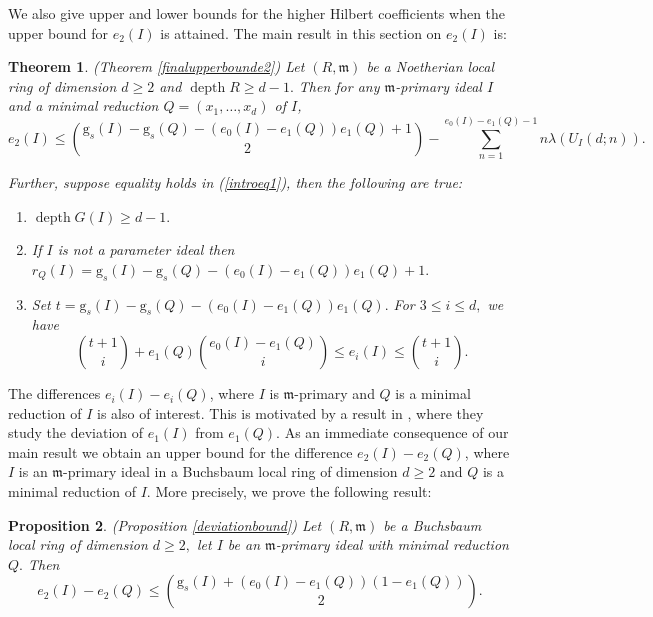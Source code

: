 \documentclass[reqno,a4paper,dvipsnames]{amsart}
\newcommand{\m}{\mathfrak{m} }
\newcommand{\depth}{\operatorname{depth}}
\newtheorem{theorem}{Theorem}[section]
\newtheorem{proposition}[theorem]{Proposition}
\theoremstyle{definition}
\begin{document}
We also give upper and lower bounds for 
the higher Hilbert coefficients  when the upper bound for $e_2(I)$ is attained.
The main result in this section on $e_2(I)$ is:
\begin{theorem} \label{theoremA} (Theorem \ref{finalupperbounde2})
Let $(R,\m)$ be a Noetherian local ring of dimension $d\geq 2$ and  $\depth R \geq d-1.$  Then  for any $\m$-primary ideal  $I$   and a  minimal reduction $Q=(x_1,\ldots,x_{d})$ of $I$, 
\begin{equation} \label{introeq1}
    e_2(I) \leq 
    \binom{\mathrm{g}_s(I) - \mathrm{g}_s(Q) - (e_{0}(I)-e_{1}(Q))e_1(Q) + 1}{2}-\displaystyle \sum_{n=1}^{e_{0}(I)-e_{1}(Q)-1}
           n\lambda(U_{I}(d;n)).
\end{equation}
    
 Further, suppose equality holds in  (\ref{introeq1}), then the following are true: 
 \begin{enumerate}[\normalfont(i)]
     \item    $\depth G(I) \geq d-1.$
     \item    If $I$ is not a parameter ideal  then 
          $r_{Q}(I)=\mathrm{g}_s(I) - \mathrm{g}_s(Q) - (e_{0}(I)-e_{1}(Q))e_1(Q)+1.$
          \item   Set $t=\mathrm{g}_{s}(I)-\mathrm{g}_s(Q) - (e_{0}(I)-e_{1}(Q))e_1(Q).$ For $3 \leq i \leq d,$ we have 
   \[\displaystyle\binom{t + 1}{i}+e_{1}(Q)\binom{e_{0}(I)-e_{1}(Q)}{i} \leq e_{i}(I) \leq\displaystyle\binom{t + 1}{i}.\]
 \end{enumerate}
\end{theorem}

The differences  $e_i(I) - e_i(Q)$, where $I$ is $\m$-primary and $Q$ is a minimal reduction of $I$ is also of interest. This is motivated by  a result in \cite[Theorem 2.6]{ghezzihong}, where they study the deviation of $e_{1}(I)$ from $e_{1}(Q)$. As an immediate consequence of our main result we 
obtain an upper bound for the difference  $e_2(I)-e_2(Q)$, where $I$ is an $\m$-primary ideal in a Buchsbaum local ring of dimension $d \geq 2$ and $Q$ is a minimal reduction of $I$. 
More precisely, we 
 prove the following result:
 \begin{proposition}
     (Proposition \ref{deviationbound})
     Let $(R,\m)$ be a Buchsbaum local ring of dimension $d \geq 2,$ let $I$ be an $\m$-primary ideal with minimal reduction $Q.$ 
 Then 
\begin{equation*}
 e_{2}(I)-e_{2}(Q) \leq \binom{\mathrm{g}_{s}(I)+(e_{0}(I)-e_{1}(Q))\left(1-e_{1}(Q)\right)}{2}.
\end{equation*}
 \end{proposition}
 
\end{document}
